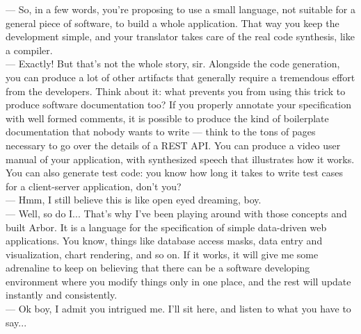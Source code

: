 \documentclass[12pt]{article} %
\newcommand{\ddwa}{data-driven web application}
\newcommand{\A}{Arbor}
\begin{document}
--- So, in a few words, you're proposing to use a small language, not suitable for a general piece of software, to build a whole application. That way you keep the development simple, and your translator takes care of the real code synthesis, like a compiler.\\
--- Exactly! But that's not the whole story, sir. Alongside the code generation, you can produce a lot of other artifacts that generally require a tremendous effort from the developers. Think about it: what prevents you from using this trick to produce software documentation too? If you properly annotate your specification with well formed comments, it is possible to produce the kind of boilerplate documentation that nobody wants to write --- think to the tons of pages necessary to go over the details of a REST API. You can produce a video user manual of your application, with synthesized speech that illustrates how it works. You can also generate test code: you know how long it takes to write test cases for a client-server application, don't you?\\
--- Hmm, I still believe this is like open eyed dreaming, boy.\\
--- Well, so do I... That's why I've been playing around with those concepts and built \A{}. It is a language for the specification of simple \ddwa{}s. You know, things like database access masks, data entry and visualization, chart rendering, and so on. If it works, it will give me some adrenaline to keep on believing that there can be a software developing environment where you modify things only in one place, and the rest will update instantly and consistently.\\
--- Ok boy, I admit you intrigued me. I'll sit here, and listen to what you have to say...
\newpage
\end{document}

